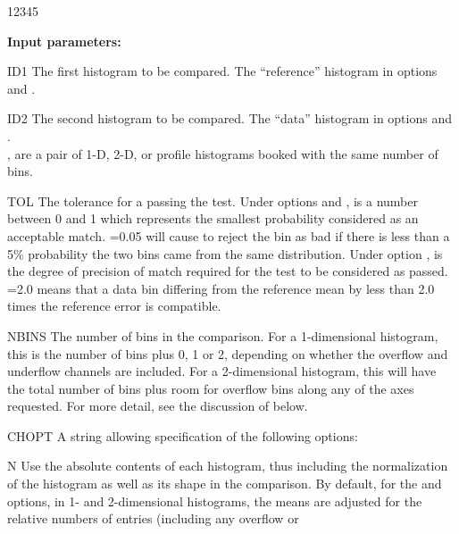 \begin{DLtt}{12345}
\item[{\rm\bf Input parameters:}]
\item[ID1]   The first histogram to be compared.
             The ``reference'' histogram in options  and .
\item[ID2]   The second histogram to be compared.
             The ``data'' histogram in options  and .\\
             ,  are a pair of 1-D, 2-D, or profile
             histograms booked with the same number of bins.
\item[TOL]   The tolerance for a passing the test.
             Under options  and , 
             is a number between 0 and 1 which
             represents the smallest probability considered as an acceptable
             match. 
             \mbox{=0.05} will cause  to reject the 
             bin as bad if there is less than a 5\% probability the 
             two bins came from the same distribution.
             Under option ,  is the degree of precision  of
             match required for the test to be considered as passed. 
             \mbox{=2.0}
             means that a data bin differing from the reference mean by
             less than 2.0 times the reference error is compatible.
\item[NBINS] The number of bins in the comparison. For a 1-dimensional
             histogram, this is the number of bins plus 0, 1 or 2, depending
             on whether the overflow and underflow channels are included.
             For a 2-dimensional histogram, this will have the total number of
             bins plus room for overflow bins along any of the axes requested.
             For more detail, see the discussion of  below.
\item[CHOPT] A string allowing specification of the following options:
             \begin{DLtt}{1}
             \item[N]  Use the absolute contents of each histogram, thus
                       including the normalization of the histogram as well as 
                       its shape in the comparison.  
                       By default, for the  and  options,
                       in 1- and 2-dimensional histograms, 
                       the means are adjusted for the
                       relative numbers of entries (including any overflow or

\end{DLtt}
\end{DLtt}
